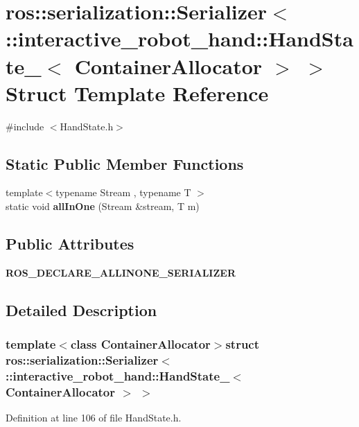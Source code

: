 \section{ros\-:\-:serialization\-:\-:Serializer$<$ \-:\-:interactive\-\_\-robot\-\_\-hand\-:\-:Hand\-State\-\_\-$<$ Container\-Allocator $>$ $>$ Struct Template Reference}
\label{structros_1_1serialization_1_1Serializer_3_01_1_1interactive__robot__hand_1_1HandState___3_01ContainerAllocator_01_4_01_4}


{\ttfamily \#include $<$Hand\-State.\-h$>$}

\subsection*{Static Public Member Functions}
\begin{DoxyCompactItemize}
\item 
{\footnotesize template$<$typename Stream , typename T $>$ }\\static void {\bf all\-In\-One} (Stream \&stream, T m)
\end{DoxyCompactItemize}
\subsection*{Public Attributes}
\begin{DoxyCompactItemize}
\item 
{\bf R\-O\-S\-\_\-\-D\-E\-C\-L\-A\-R\-E\-\_\-\-A\-L\-L\-I\-N\-O\-N\-E\-\_\-\-S\-E\-R\-I\-A\-L\-I\-Z\-E\-R}
\end{DoxyCompactItemize}


\subsection{Detailed Description}
\subsubsection*{template$<$class Container\-Allocator$>$struct ros\-::serialization\-::\-Serializer$<$ \-::interactive\-\_\-robot\-\_\-hand\-::\-Hand\-State\-\_\-$<$ Container\-Allocator $>$ $>$}



Definition at line 106 of file Hand\-State.\-h.



